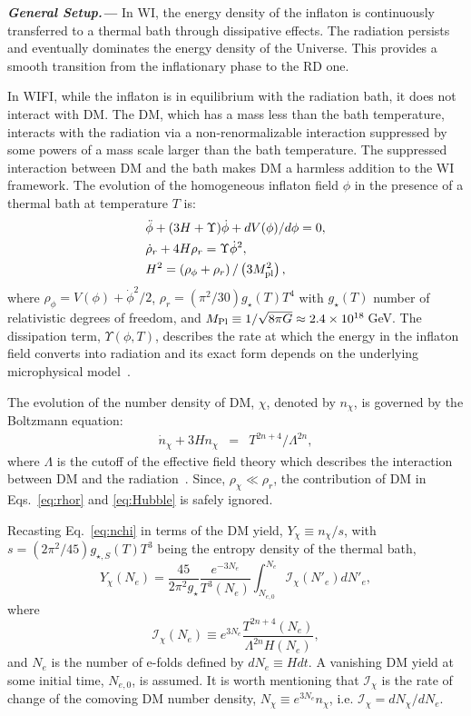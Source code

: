 \documentclass[notitlepage,nofootinbib,preprintnumbers,aps,superscriptaddress,twocolumn]{revtex4-1}
\begin{document}
\textbf{\textit{General Setup.---\label{sec:model}}} 
In WI, the energy density of the inflaton is continuously transferred to a thermal bath through dissipative effects.  The radiation persists and eventually dominates the energy density of the Universe. This provides a smooth transition from the inflationary phase to the RD one.

In WIFI, while the inflaton
is in equilibrium with the radiation bath, it does not interact with DM. The DM, which has a mass less than the bath temperature, interacts with the radiation via a non-renormalizable interaction suppressed by some powers of a mass scale larger than the bath temperature. The suppressed interaction between DM and the bath makes DM a harmless addition to the WI framework. The evolution of the homogeneous inflaton
field $\phi$ in the presence of a thermal bath at temperature $T$ is:
\begin{align}
    &\ddot{\phi}+(3H+\Upsilon)\dot{\phi}+dV(\phi)/d\phi=0,\label{eq:inflaton} \\
    & \dot{\rho}_r+4H\rho_r=\Upsilon \dot{\phi}^2,\label{eq:rhor} \\
    & H^2=\left(\rho_\phi+\rho_r\right)/\left(3 M_{\rm{pl}}^2\right),\label{eq:Hubble}
\end{align}
where $\rho_\phi=V(\phi)+\dot{\phi}^2/2$, $\rho_r=(\pi^2/30)g_\star(T)T^4$ with $g_\star(T)$ number of relativistic degrees of freedom, and $M_{\rm{Pl}}\equiv 1/\sqrt{8\pi G}\approx 2.4 \times 10^{18}\,$GeV. 
 The dissipation term, $\Upsilon(\phi,T)$, describes the rate at which the energy in the inflaton field converts into radiation and its exact form depends on the underlying microphysical model~\cite{Berera:1998px}. 

The evolution of the number density of DM, $\chi$, denoted by $n_\chi$, is governed by the Boltzmann equation:
\begin{eqnarray}
    \dot{n}_\chi+3H n_\chi&=&T^{2n+4}/\Lambda^{2n},\label{eq:nchi}
\end{eqnarray}
where $\Lambda$ is the cutoff of the effective field theory which describes the interaction between DM and the radiation~\cite{Elahi:2014fsa}. Since, $\rho_\chi\ll \rho_r$, the contribution of DM in Eqs.~\eqref{eq:rhor} and \eqref{eq:Hubble} is safely ignored.

Recasting Eq.~\eqref{eq:nchi} in terms of the DM yield, $Y_\chi\equiv n_\chi / s$, with $s=(2\pi^2/45)g_{\star, S}(T)T^3$ being the entropy density of the thermal bath,
\begin{equation}
 Y_\chi(N_e)=\frac{45}{2\pi^2g_\star}\frac{e^{-3N_e}}{ T^3(N_e)}\int_{N_{e, 0}}^{N_e}\mathcal{I}_\chi(N'_e) dN'_e,
 \label{eq:DMyield}
\end{equation}
where
\begin{equation}
    \mathcal{I}_\chi(N_e)\equiv e^{3N_e}\frac{T^{2n+4}(N_e)}{\Lambda^{2n}H(N_e)}, \label{eq:DMYintegrand}
\end{equation}
and $N_e$ is the number of e-folds defined by $dN_e\equiv Hdt$. A vanishing DM yield at some initial time, $N_{e, 0}$, is assumed.
It is worth mentioning that $\mathcal{I}_\chi$ is the rate of change of the comoving DM number density, $N_\chi\equiv e^{3N_e}n_\chi$, i.e.  $\mathcal{I}_\chi= dN_\chi/dN_e$.
\end{document}

